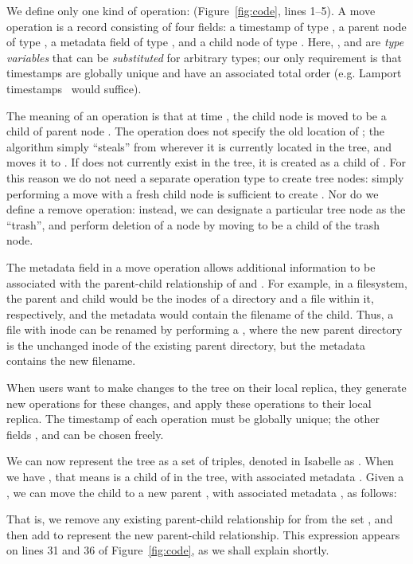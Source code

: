 \documentclass[sigconf]{acmart}
\begin{document}
We define only one kind of operation:  (Figure~\ref{fig:code}, lines 1--5).
A move operation is a record consisting of four fields: a timestamp  of type , a parent node  of type , a metadata field  of type , and a child node  of type .
Here, ,  and  are \emph{type variables} that can be \emph{substituted} for arbitrary types; our only requirement is that timestamps  are globally unique and have an associated total order (e.g. Lamport timestamps~\cite{Lamport:1978jq} would suffice).

The meaning of an operation  is that at time , the child node  is moved to be a child of parent node .
The operation does not specify the old location of ; the algorithm simply ``steals''  from wherever it is currently located in the tree, and moves it to .
If  does not currently exist in the tree, it is created as a child of .
For this reason we do not need a separate operation type to create tree nodes: simply performing a move with a fresh child node  is sufficient to create .
Nor do we define a remove operation: instead, we can designate a particular tree node as the ``trash'', and perform deletion of a node  by moving  to be a child of the trash node.

The metadata field  in a move operation allows additional information to be associated with the parent-child relationship of  and .
For example, in a filesystem, the parent and child would be the inodes of a directory and a file within it, respectively, and the metadata would contain the filename of the child.
Thus, a file with inode  can be renamed by performing a , where the new parent directory  is the unchanged inode of the existing parent directory, but the metadata  contains the new filename.

When users want to make changes to the tree on their local replica, they generate new  operations for these changes, and apply these operations to their local replica.
The timestamp  of each operation must be globally unique; the other fields ,  and  can be chosen freely.

We can now represent the tree as a set of  triples, denoted in Isabelle as .
When we have , that means  is a child of  in the tree, with associated metadata .
Given a , we can move the child  to a new parent , with associated metadata , as follows:
\begin{quote}
\end{quote}
That is, we remove any existing parent-child relationship for  from the set , and then add  to represent the new parent-child relationship.
This expression appears on lines 31 and 36 of Figure~\ref{fig:code}, as we shall explain shortly.
\end{document}
